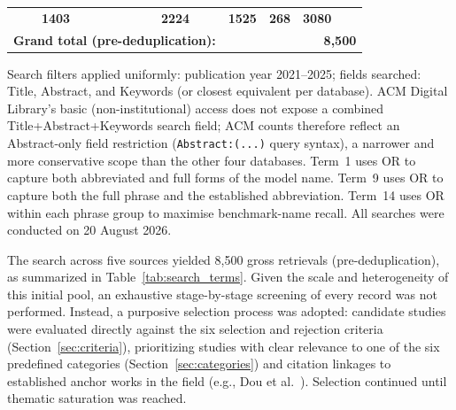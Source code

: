 \documentclass[10pt,a4paper]{article}
\begin{document}
\begin{table}[!t]
\begin{tabular}{@{}clcccccc@{}}
& \textbf{1403} & \textbf{2224} & \textbf{1525} 
& \textbf{268} & \textbf{3080} \\
\multicolumn{3}{r}{\textbf{Grand total (pre-deduplication):}} 
& \multicolumn{5}{r}{\textbf{8,500}} \\
\bottomrule
\end{tabular}
\begin{flushleft}
\footnotesize
Search filters applied uniformly: publication year 2021--2025;
fields searched: Title, Abstract, and Keywords (or closest equivalent
per database). ACM Digital Library's basic (non-institutional) access
does not expose a combined Title+Abstract+Keywords search field;
ACM counts therefore reflect an Abstract-only field restriction
(\texttt{Abstract:(...)} query syntax), a narrower and more conservative
scope than the other four databases. Term~1 uses OR to capture both
abbreviated and full forms of the model name. Term~9 uses OR to
capture both the full phrase and the established abbreviation.
Term~14 uses OR within each phrase group to maximise benchmark-name
recall. All searches were conducted on 20 August 2026.
\end{flushleft}
\end{table}

The search across five sources yielded 8,500 gross retrievals (pre-deduplication), as summarized in Table~\ref{tab:search_terms}. Given the scale and heterogeneity of this initial pool, an exhaustive stage-by-stage screening of every record was not performed. Instead, a purposive selection process was adopted: candidate studies were evaluated directly against the six selection and rejection criteria (Section~\ref{sec:criteria}), prioritizing studies with clear relevance to one of the six predefined categories (Section~\ref{sec:categories}) and citation linkages to established anchor works in the field (e.g., Dou et al.~\cite{dou2026}). Selection continued until thematic saturation was reached.
\end{document}
